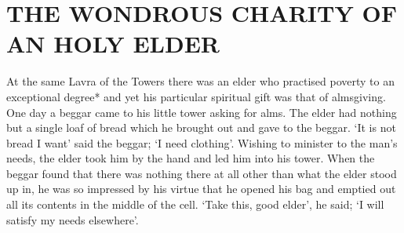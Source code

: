 \chapter{THE WONDROUS CHARITY OF AN HOLY ELDER}

At the same Lavra of the Towers there was an elder who practised poverty to an exceptional degree* and yet his particular spiritual gift was that of almsgiving.
One day a beggar came to his little tower asking for alms.
The elder had nothing but a single loaf of bread which he brought out and gave to the beggar.
`It is not bread I want' said the beggar; `I need clothing'.
Wishing to minister to the man's needs, the elder took him by the hand and led him into his tower.
When the beggar found that there was nothing there at all other than what the elder stood up in, he was so impressed by his virtue that he opened his bag and emptied out all its contents in the middle of the cell.
`Take this, good elder', he said; `I will satisfy my needs elsewhere'.

